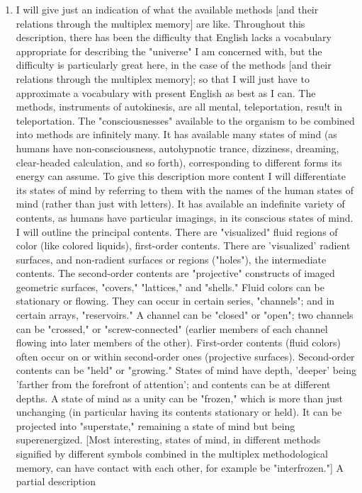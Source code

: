 \documentclass[10pt,twoside]{memoir}
\begin{document}
\begin{enumerate}
{\begin{enumerate}
\begin{sysrules}
\begin{sysrules}
\begin{sysrules}
\begin{sysrules}
{\begin{enumerate}
\begin{enumerate}
\item I will give just an indication of what the available methods [and 
their relations through the multiplex memory] are like. Throughout this 
description, there has been the difficulty that English lacks a vocabulary 
appropriate for describing the "universe" I am concerned with, but the 
difficulty is particularly great here, in the case of the methods [and their 
relations through the multiplex memory]; so that I will just have to 
approximate a vocabulary with present English as best as I can. The 
methods, instruments of autokinesis, are all mental, teleportation, resu!t in 
teleportation. The "consciousnesses" available to the organism to be 
combined into methods are infinitely many. It has available many states of 
mind (as humans have non-consciousness, autohypnotic trance, dizziness, 
dreaming, clear-headed calculation, and so forth), corresponding to different 
forms its energy can assume. To give this description more content I will 
differentiate its states of mind by referring to them with the names of the 
human states of mind (rather than just with letters). It has available an 
indefinite variety of contents, as humans have particular imagings, in its 
conscious states of mind. I will outline the principal contents. There are 
"visualized" fluid regions of color (like colored liquids), first-order contents. 
There are 'visualized' radient surfaces, and non-radient surfaces or regions 
("holes"), the intermediate contents. The second-order contents are 
"projective" constructs of imaged geometric surfaces, "covers," "lattices," 
and "shells." Fluid colors can be stationary or flowing. They can occur in 
certain series, "channels"; and in certain arrays, "reservoirs." A channel can 
be "closed" or "open"; two channels can be "crossed," or 
"screw-connected" (earlier members of each channel flowing into later 
members of the other). First-order contents (fluid colors) often occur on or 
within second-order ones (projective surfaces). Second-order contents can be 
"held" or "growing." States of mind have depth, 'deeper' being 'farther from 
the forefront of attention'; and contents can be at different depths. A state 
of mind as a unity can be "frozen," which is more than just unchanging (in 
particular having its contents stationary or held). It can be projected into 
"superstate," remaining a state of mind but being superenergized. [Most 
interesting, states of mind, in different methods signified by different 
symbols combined in the multiplex methodological memory, can have 
contact with each other, for example be "interfrozen."] A partial description 

\end{enumerate}
\end{enumerate}}
\end{sysrules}
\end{sysrules}
\end{sysrules}
\end{sysrules}
\end{enumerate}}
\end{enumerate}
\end{document}
